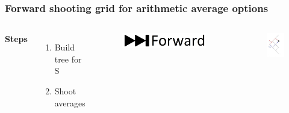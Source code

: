 \documentclass{beamer}
\begin{document}
\begin{frame}
\frametitle{Forward shooting grid for arithmetic average options}
\begin{columns}[c] %

\textbf{Steps}
\begin{enumerate}
\item Build tree for S
\item Shoot averages
\end{enumerate}

\begin{figure}
	\includegraphics[scale=0.1]{forward}
\end{figure}
\begin{figure}
	\includegraphics[scale=0.5]{average_path}
\end{figure}

\end{columns}
\end{frame}
\end{document}
